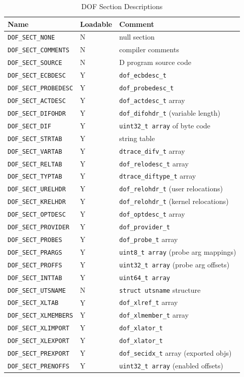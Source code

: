 \begin{table}
  \centering
\begin{tabular}{|l|l|l|}
\hline
  Name & Loadable & Comment\\
\hline
\verb|DOF_SECT_NONE| & N & null section\\
\verb|DOF_SECT_COMMENTS| & N & compiler comments\\
\verb|DOF_SECT_SOURCE| & N & D program source code\\
\verb|DOF_SECT_ECBDESC| & Y & \verb|dof_ecbdesc_t|\\
\verb|DOF_SECT_PROBEDESC| & Y & \verb|dof_probedesc_t|\\
\verb|DOF_SECT_ACTDESC| & Y & \verb|dof_actdesc_t| array\\
\verb|DOF_SECT_DIFOHDR| & Y & \verb|dof_difohdr_t| (variable length)\\
\verb|DOF_SECT_DIF| & Y & \verb|uint32_t array| of byte code\\
\verb|DOF_SECT_STRTAB| & Y & string table\\
\verb|DOF_SECT_VARTAB| & Y & \verb|dtrace_difv_t| array\\
\verb|DOF_SECT_RELTAB| & Y & \verb|dof_relodesc_t| array\\
\verb|DOF_SECT_TYPTAB| & Y & \verb|dtrace_diftype_t| array\\
\verb|DOF_SECT_URELHDR| & Y & \verb|dof_relohdr_t| (user relocations)\\
\verb|DOF_SECT_KRELHDR| & Y & \verb|dof_relohdr_t| (kernel relocations)\\
\verb|DOF_SECT_OPTDESC| & Y & \verb|dof_optdesc_t| array\\
\verb|DOF_SECT_PROVIDER| & Y & \verb|dof_provider_t|\\
\verb|DOF_SECT_PROBES| & Y & \verb|dof_probe_t| array\\
\verb|DOF_SECT_PRARGS| & Y & \verb|uint8_t array| (probe arg mappings)\\
\verb|DOF_SECT_PROFFS| & Y & \verb|uint32_t array| (probe arg offsets)\\
\verb|DOF_SECT_INTTAB| & Y & \verb|uint64_t array|\\
\verb|DOF_SECT_UTSNAME| & N & \verb|struct utsname| structure\\
\verb|DOF_SECT_XLTAB| & Y & \verb|dof_xlref_t| array\\
\verb|DOF_SECT_XLMEMBERS| & Y & \verb|dof_xlmember_t| array\\
\verb|DOF_SECT_XLIMPORT| & Y & \verb|dof_xlator_t|\\
\verb|DOF_SECT_XLEXPORT| & Y & \verb|dof_xlator_t|\\
\verb|DOF_SECT_PREXPORT| & Y & \verb|dof_secidx_t| array (exported objs)\\
\verb|DOF_SECT_PRENOFFS| & Y & \verb|uint32_t array| (enabled offsets)\\
\hline
\end{tabular}
  \caption{DOF Section Descriptions}
  \label{tab:dof-sections}
\end{table}



